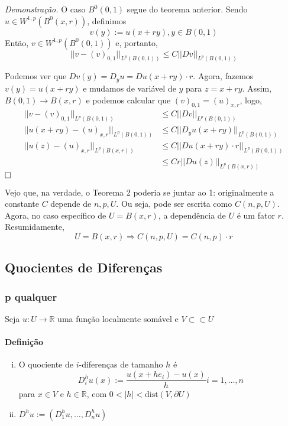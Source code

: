 \documentclass[a4paper, 11pt]{article}
\newcommand{\qed}{$\hfill\square$}
\newcommand{\R}{\mathbb{R}}
\newcommand{\pu}{\partial U}
\begin{document}
\textit{Demonstração.} O caso $B^0(0,1)$ segue do teorema anterior. Sendo $u  \in W^{1,p}(B^0(x,r))$, definimos \[v(y):=u(x+ry), y \in B(0,1)\] Então, $v \in W^{1,p}(B^0(0,1))$ e, portanto, \[ || v - (v)_{0,1}||_{L^p(B(0,1))} \leq C ||Dv||_{L^p(B(0,1))}\]

Podemos ver que $Dv(y) = D_yu = Du(x+ry)\cdot r$. Agora, fazemos $v(y)=u(x+ry)$ e mudamos de variável de $y$ para $z=x+ry$. Assim, $B(0,1) \rightarrow B(x,r)$ e podemos calcular que $(v)_{0,1}=(u)_{x,r}$, logo,
\begin{align*}
	|| v - (v)_{0,1}||_{L^p(B(0,1))} &\leq C ||Dv||_{L^p(B(0,1))} \\
	|| u(x+ry) - (u)_{x,r}||_{L^p(B(0,1))} &\leq C ||D_y u(x+ry)||_{L^p(B(0,1))} \\
	|| u(z) - (u)_{x,r}||_{L^p(B(x,r))} &\leq C ||Du(x+ry)\cdot r||_{L^p(B(0,1))} \\
	&\leq C r ||Du(z)||_{L^p(B(x,r))}
\end{align*}\qed

Vejo que, na verdade, o Teorema 2 poderia se juntar ao 1: originalmente a constante $C$ depende de $n,p,U$. Ou seja, pode ser escrita como $C(n,p,U)$. Agora, no caso específico de $U=B(x,r)$, a dependência de $U$ é um fator $r$. Resumidamente, \[U = B(x,r) \Rightarrow C(n,p,U) = C(n,p)\cdot r\]







\subsection{Quocientes de Diferenças}

\subsubsection{p qualquer}

Seja $u:U\rightarrow \R$ uma função localmente somável e $V\subset\subset U$

\paragraph{Definição}
\begin{enumerate}[(i)]
	\item O quociente de $i$-diferenças de tamanho $h$ é \[
		D_i^h u(x) := \frac{u(x+he_i)-u(x)}{h} i=1,\ldots,n\]
	para $x \in V$ e $h \in \R$, com $0<|h|<\text{dist}(V, \pu)$
	\item $D^h u := (D_1^hu, \ldots, D_n^h u)$
\end{enumerate}
\end{document}
